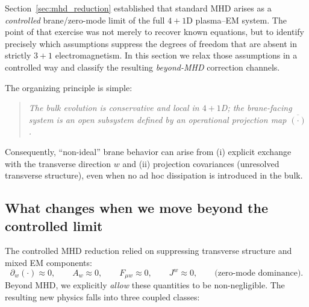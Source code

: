 \documentclass[11pt]{article}
\begin{document}
Section~\ref{sec:mhd_reduction} established that standard MHD arises as a \emph{controlled}
brane/zero-mode limit of the full \(4+1\)D plasma--EM system. The point of that exercise
was not merely to recover known equations, but to identify precisely which assumptions
suppress the degrees of freedom that are absent in strictly \(3+1\) electromagnetism.
In this section we relax those assumptions in a controlled way and classify the resulting
\emph{beyond-MHD} correction channels.

The organizing principle is simple:
\begin{quote}
\emph{The bulk evolution is conservative and local in \(4+1\)D; the brane-facing system is an
open subsystem defined by an operational projection map \(\overline{(\cdot)}\).}
\end{quote}
Consequently, ``non-ideal'' brane behavior can arise from
(i) explicit exchange with the transverse direction \(w\) and
(ii) projection covariances (unresolved transverse structure),
even when no ad hoc dissipation is introduced in the bulk.

\subsection{What changes when we move beyond the controlled limit}
\label{sec:beyond_mhd_channels}

The controlled MHD reduction relied on suppressing transverse structure and mixed EM components:
\begin{equation}
\partial_w(\cdot)\approx 0,
\qquad
A_w\approx 0,
\qquad
F_{\mu w}\approx 0,
\qquad
J^w\approx 0,
\qquad
\text{(zero-mode dominance)}.
\label{eq:controlled_limit_suppression_recall}
\end{equation}
Beyond MHD, we explicitly \emph{allow} these quantities to be non-negligible. The resulting
new physics falls into three coupled classes:
\end{document}
